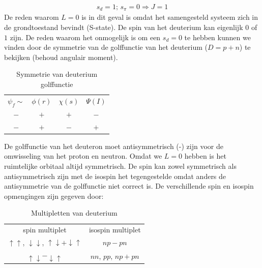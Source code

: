 \documentclass[../main.tex]{subfiles}
\begin{document}
\begin{equation}
    \begin{aligned}
        \label{eq:grondtoestand_deuteron}
        s_d=1\text{; }s_\pi=0 \Rightarrow J=1
    \end{aligned}
\end{equation}
De reden waarom $L=0$ is in dit geval is omdat het samengesteld systeem zich in de grondtoestand bevindt (S-state). De spin van het deuterium kan eigenlijk $0$ of $1$ zijn. De reden waarom het onmogelijk is om een $s_d=0$ te hebben kunnen we vinden door de symmetrie van de golffunctie van het deuterium ($D=p+n$) te bekijken (behoud angulair moment).

\begin{table}[h]
    \centering
    \caption{Symmetrie van deuterium golffunctie}
    \label{tab:sym_deut_golf}
    \begin{tabular}{cccc}
        $\psi_f\sim$ & $\phi(r)$ & $\chi(s)$                & $\Psi(I)$             \\
        $-$             & $+$       & {\color{green} $+$}   & {\color{green} $-$}   \\
        $-$             & $+$       & {\color{red} $-$}     & {\color{red} $+$}     \\
    \end{tabular}
\end{table}

De golffunctie van het deuteron moet antisymmetrisch (-) zijn voor de omwisseling van het proton en neutron. Omdat we $L=0$ hebben is het ruimtelijke orbitaal altijd symmetrisch. De spin kan zowel symmetrisch als antisymmetrisch zijn met de isospin het tegengestelde omdat anders de antisymmetrie van de golffunctie niet correct is. De verschillende spin en isospin opmengingen zijn gegeven door:

\begin{table}[h]
    \centering
    \caption{Multipletten van deuterium}
    \label{tab:mult_deut}
    \begin{tabular}{cc}
        spin multiplet & isospin multiplet \\
        {\color{green} $\uparrow\uparrow$, $\downarrow\downarrow$, $\uparrow\downarrow+\downarrow\uparrow$} & {\color{green} $np-pn$} \\
        {\color{red} $\uparrow\downarrow-\downarrow\uparrow$} & {\color{red} $nn$, $pp$, $np+pn$}
    \end{tabular}
\end{table}
\end{document}
